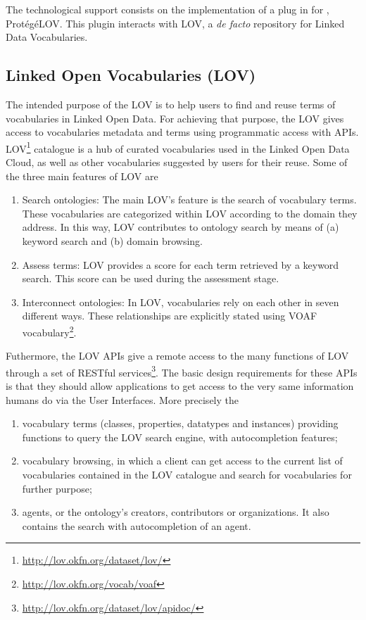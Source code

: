 The technological support consists on the implementation of a plug in for \protege, Prot{\'e}g{\'e}LOV. This plugin interacts with LOV, a \emph{de facto} repository for Linked Data Vocabularies.

\vspace{1mm}
\subsection{Linked Open Vocabularies (LOV)}\label{sec:lov}
The intended purpose of the LOV \cite{vandenbusschelov} is to help users to find and reuse terms of vocabularies in Linked Open Data. For achieving that purpose, the LOV gives access to vocabularies metadata and terms using programmatic access with APIs.  
LOV\footnote{\url{http://lov.okfn.org/dataset/lov/}} catalogue is a hub of curated vocabularies used in the Linked Open Data Cloud, as well as other vocabularies suggested by users for their reuse. 
Some of the three main features of LOV are 
\begin{enumerate}
\item Search ontologies: The main LOV's feature is the search of vocabulary terms. These vocabularies are categorized within LOV according to the domain they address. In this way, LOV contributes to ontology search by means of (a) keyword search and (b) domain browsing.
\item Assess terms: LOV provides a score for each term retrieved by a keyword search. This score can be used during the assessment stage.
\item Interconnect ontologies: In LOV, vocabularies rely on each other in seven different ways. These relationships are explicitly stated using VOAF vocabulary\footnote{\url{http://lov.okfn.org/vocab/voaf}}. 
\end{enumerate}

Futhermore, the LOV APIs give a remote access to the many functions of LOV through a set of RESTful services\footnote{\url{http://lov.okfn.org/dataset/lov/apidoc/}}. The basic design requirements for these APIs is that they should allow applications to get access to the very same information humans do via the User Interfaces. More precisely the

\begin{enumerate} 
\item vocabulary terms (classes, properties, datatypes and instances) providing functions to query the LOV search engine, with autocompletion features;
\item vocabulary browsing, in which a client can get access to the current list of vocabularies contained in the LOV catalogue and search for vocabularies for further purpose;
\item agents, or the ontology's creators, contributors or organizations. It also contains the search with autocompletion of an agent.
\end{enumerate}
\vspace{1mm}
